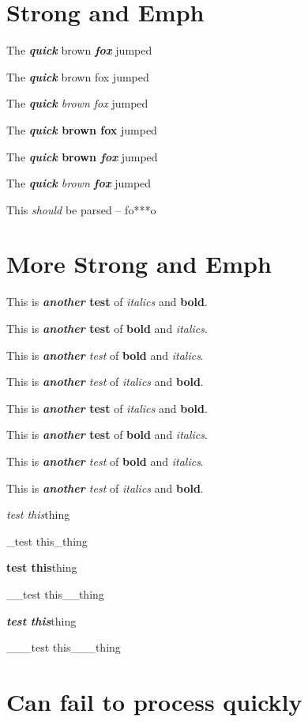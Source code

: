 
\def\mytitle{Edge Cases}


\part{Strong and Emph}
\label{strongandemph}

The \textbf{\emph{quick}} brown \textbf{\emph{fox}} jumped

The \textbf{\emph{quick}} brown fox jumped

The \emph{\textbf{quick} brown fox} jumped

The \textbf{\emph{quick} brown fox} jumped

The \textbf{\emph{quick} brown \emph{fox}} jumped

The \emph{\textbf{quick} brown \textbf{fox}} jumped

This \emph{should} be parsed -- fo***o

\part{More Strong and Emph}
\label{morestrongandemph}

This is \textbf{\emph{another} test} of \emph{italics} and \textbf{bold}.

This is \textbf{\emph{another} test} of \textbf{bold} and \emph{italics}.

This is \emph{\textbf{another} test} of \textbf{bold} and \emph{italics}.

This is \emph{\textbf{another} test} of \emph{italics} and \textbf{bold}.

This is \textbf{\emph{another} test} of \emph{italics} and \textbf{bold}.

This is \textbf{\emph{another} test} of \textbf{bold} and \emph{italics}.

This is \emph{\textbf{another} test} of \textbf{bold} and \emph{italics}.

This is \emph{\textbf{another} test} of \emph{italics} and \textbf{bold}.

\emph{test this}thing

\_test this\_thing

\textbf{test this}thing

\_\_test this\_\_thing

\textbf{\emph{test this}}thing

\_\_\_test this\_\_\_thing

\part{Can fail to process quickly}
\label{canfailtoprocessquickly}


